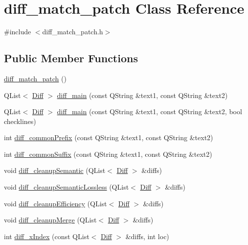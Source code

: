 \hypertarget{classdiff__match__patch}{
\section{diff\_\-match\_\-patch Class Reference}
\label{classdiff__match__patch}
}


{\ttfamily \#include $<$diff\_\-match\_\-patch.h$>$}

\subsection*{Public Member Functions}
\begin{DoxyCompactItemize}
\item 
\hyperlink{classdiff__match__patch_a0c839cb3f22ff25e4d89f09554a2dd2c}{diff\_\-match\_\-patch} ()
\item 
QList$<$ \hyperlink{class_diff}{Diff} $>$ \hyperlink{classdiff__match__patch_a82fe78383b2fddf542fe83e057252e53}{diff\_\-main} (const QString \&text1, const QString \&text2)
\item 
QList$<$ \hyperlink{class_diff}{Diff} $>$ \hyperlink{classdiff__match__patch_a106a1cb355978e1d2c60fb6487667fe3}{diff\_\-main} (const QString \&text1, const QString \&text2, bool checklines)
\item 
int \hyperlink{classdiff__match__patch_a6139ad292f602b8b9295fe0c48709e31}{diff\_\-commonPrefix} (const QString \&text1, const QString \&text2)
\item 
int \hyperlink{classdiff__match__patch_aed765d65d9e6fb78de3725416a262586}{diff\_\-commonSuffix} (const QString \&text1, const QString \&text2)
\item 
void \hyperlink{classdiff__match__patch_a1150e91652b023e8893555f737ac9894}{diff\_\-cleanupSemantic} (QList$<$ \hyperlink{class_diff}{Diff} $>$ \&diffs)
\item 
void \hyperlink{classdiff__match__patch_afd96870070c1dc460d1c261fa3f0f485}{diff\_\-cleanupSemanticLossless} (QList$<$ \hyperlink{class_diff}{Diff} $>$ \&diffs)
\item 
void \hyperlink{classdiff__match__patch_a41df9d26471d7d9f4ca085ab9f5da945}{diff\_\-cleanupEfficiency} (QList$<$ \hyperlink{class_diff}{Diff} $>$ \&diffs)
\item 
void \hyperlink{classdiff__match__patch_ad64d391bc3f34cad326f869eedb748f9}{diff\_\-cleanupMerge} (QList$<$ \hyperlink{class_diff}{Diff} $>$ \&diffs)
\item 
int \hyperlink{classdiff__match__patch_a91474da17c89bab2ca34efa207fe85b4}{diff\_\-xIndex} (const QList$<$ \hyperlink{class_diff}{Diff} $>$ \&diffs, int loc)

\end{DoxyCompactItemize}
